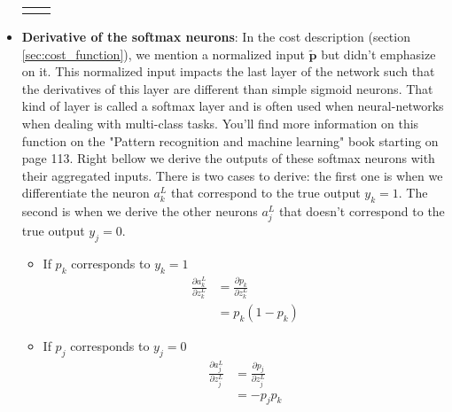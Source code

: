\begin{itemize}
\begin{tabular}{c|c}
{\begin{equation}
							\end{equation}
						}
					\end{tabular}
				\item \textbf{Derivative of the softmax neurons}: In the cost description (section \ref{sec:cost_function}), we mention a normalized input $\widetilde{\boldsymbol{p}}$ but didn't emphasize on it. This normalized input impacts the last layer of the network such that the derivatives of this layer are different than simple sigmoid neurons. That kind of layer is called a softmax layer and is often used when neural-networks when dealing with multi-class tasks. You'll find more information on this function on the "Pattern recognition and machine learning" book \cite{bishop2006pattern} starting on page 113. Right bellow we derive the outputs of these softmax neurons with their aggregated inputs. There is two cases to derive: the first one is when we differentiate the neuron $a^L_k$ that correspond to the true output $y_k=1$. The second is when we derive the other neurons $a^L_j$ that doesn't correspond to the true output $y_j=0$.
				\begin{itemize}
					\item If $p_k$ corresponds to $y_k=1$
						\begin{equation}
							\label{eq:softmax_deriv_1}
							\begin{split}
								\frac{\partial a^L_k}{\partial z^L_k}
								&= \frac{\partial p_k}{\partial z^L_k} \\
								&= p_k (1-p_k)
							\end{split}
						\end{equation}
					\item If $p_j$ corresponds to $y_j=0$
						\begin{equation}
							\label{eq:softmax_deriv_2}
							\begin{split}
								\frac{\partial a^L_j}{\partial z^L_j}
								&= \frac{\partial p_j}{\partial z^L_j}\\
								&= -p_j p_k
							\end{split}
						\end{equation}
				\end{itemize}
			\end{itemize}

